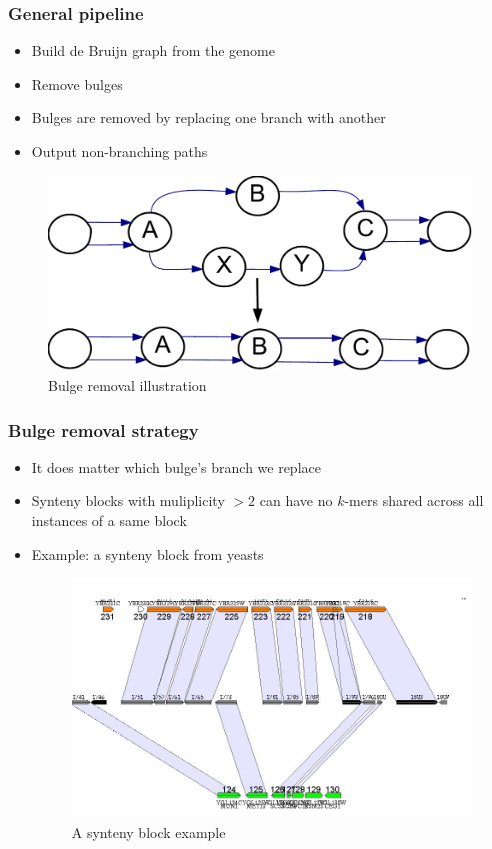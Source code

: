 \documentclass[svgnames,14pt]{beamer}
\begin{document}
\begin{frame}
\frametitle{General pipeline}
\begin{itemize}
\item Build de Bruijn graph from the genome
\item Remove bulges
\item Bulges are removed by replacing one branch with another
\item Output non-branching paths
\end{itemize}
\begin{changemargin}{-1.cm}{-1.cm}
\begin{figure}
\centering
\includegraphics[scale = 0.45]{Figure3.pdf}
\small \caption{Bulge removal illustration}
\end{figure}
\end{changemargin}
\end{frame}

\begin{frame}
\frametitle{Bulge removal strategy}
\begin{itemize}
\item It does matter which bulge's branch we replace
\item Synteny blocks with muliplicity \(>2\) can have no \(k\)-mers shared across all instances of a same block
\item Example: a synteny block from yeasts 
\begin{changemargin}{-1.cm}{-1.cm}
\begin{figure}
\centering
\includegraphics[scale = 0.30]{Figure5.png}
\small \caption{A synteny block example}
\end{figure}
\end{changemargin}
\end{itemize}
\end{frame}
\end{document}
